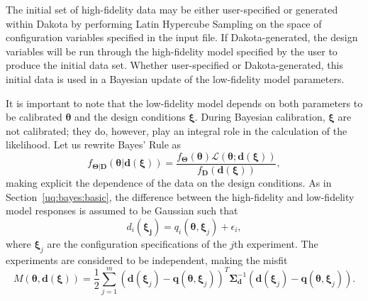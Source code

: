 The initial set of high-fidelity data may be either user-specified or generated
within Dakota by performing Latin Hypercube Sampling on the space of 
configuration variables specified in the input file. If Dakota-generated, the 
design variables will be run through the high-fidelity model specified by the
user to produce the initial data set. Whether user-specified or 
Dakota-generated, this initial data is used in a Bayesian update of the 
low-fidelity model parameters. 

It is important to note that the low-fidelity model depends on both parameters 
to be calibrated $\boldsymbol{\theta}$ and the design conditions 
$\boldsymbol{\xi}$. During Bayesian calibration, $\boldsymbol{\xi}$ are not 
calibrated; they do, however, play an integral role in the calculation of the 
likelihood. Let us rewrite Bayes' Rule as
\begin{equation}
{f_{\boldsymbol{\Theta |D}}}\left( \boldsymbol{\theta |d(\xi)} \right) 
= \frac{{{f_{\boldsymbol{\Theta}}}\left( \boldsymbol{\theta} \right)
\mathcal{L}\left( \boldsymbol{\theta;d(\xi)} \right)}}
{{{f_{\boldsymbol{D}}}\left( \boldsymbol{d(\xi)} \right)}},
\label{eq:expdesign_bayes}
\end{equation}
making explicit the dependence of the data on the design conditions. As in
Section~\ref{uq:bayes:basic}, the difference between the high-fidelity and 
low-fidelity model responses is assumed to be Gaussian such that
\begin{equation}
d_{i}(\boldsymbol{\xi_{j}}) = q_{i}(\boldsymbol{\theta,\xi}_{j}) + \epsilon_{i},
\end{equation}
where $\boldsymbol{\xi}_{j}$ are the configuration specifications of the $j$th 
experiment. The experiments are considered to be independent, making the misfit 
\begin{equation}
M(\boldsymbol{\theta, d(\xi)}) = \frac{1}{2} \sum_{j = 1}^{m} 
\left( \boldsymbol{d}(\boldsymbol{\xi}_{j}) - 
\boldsymbol{q}(\boldsymbol{\theta, \xi}_{j}) \right)^{T}
\boldsymbol{\Sigma}_{\boldsymbol{d}}^{-1}
\left( \boldsymbol{d}(\boldsymbol{\xi}_{j}) - 
\boldsymbol{q}(\boldsymbol{\theta, \xi}_{j}) \right).
\end{equation}


